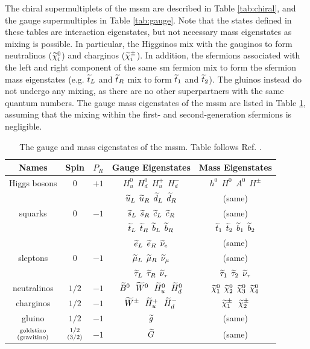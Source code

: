 The chiral supermultiplets of the \gls{mssm} are described in Table \ref{tab:chiral}, and the gauge supermultiples in Table \ref{tab:gauge}. Note that the states defined in these tables are interaction eigenstates, but not necessary mass eigenstates as mixing is possible. In particular, the Higgsinos mix with the gauginos to form neutralinos ($\widetilde{\chi}^0_i$) and charginos ($\widetilde{\chi}^\pm_i$). In addition, the sfermions associated with the left and right component of the same \gls{sm} fermion mix to form the sfermion mass eigenstates (e.g. $\widetilde{t}_L$ and $\widetilde{t}_R$ mix to form $\widetilde{t}_1$ and $\widetilde{t}_2$). The gluinos instead do not undergo any mixing, as there are no other superpartners with the same  quantum numbers. The gauge mass eigenstates of the \gls{mssm} are listed in Table \ref{tab:undiscovered}, assuming that the mixing within the first- and second-generation sfermions is negligible.


\begin{table}[tb]
\begin{center}
\begin{tabular}{c c c c c }
\hline
Names & Spin & $P_R$ & Gauge Eigenstates & Mass Eigenstates \\
\hline\hline
Higgs bosons & 0 & $+1$ & 
$H_u^0\>\> H_d^0\>\> H_u^+ \>\> H_d^-$ 
& 
$h^0\>\> H^0\>\> A^0 \>\> H^\pm$
\\ \hline
& & &${\widetilde u}_L\>\> {\widetilde u}_R\>\> \widetilde d_L\>\> \widetilde d_R$&(same)
\\
squarks& 0&$-1$& ${\widetilde s}_L\>\> {\widetilde s}_R\>\> \widetilde c_L\>\>
\widetilde c_R$& (same) \\
& & &
$\widetilde t_L \>\>\widetilde t_R \>\>\widetilde b_L\>\> \widetilde b_R$ 
&
${\widetilde t}_1\>\> {\widetilde t}_2\>\> \widetilde b_1\>\> \widetilde b_2$
\\ \hline
& & &${\widetilde e}_L\>\> {\widetilde e}_R \>\>\widetilde \nu_e$&(same) 
\\
sleptons& 0&$-1$&${\widetilde \mu}_L\>\>{\widetilde \mu}_R\>\>\widetilde\nu_\mu$&(same)
\\
& & &
$\widetilde \tau_L\>\> \widetilde \tau_R \>\>\widetilde \nu_\tau$ 
&
${\widetilde \tau}_1 \>\>{\widetilde \tau}_2 \>\>\widetilde \nu_\tau$
\\
\hline
neutralinos & $1/2$&$-1$ & 
$\widetilde B^0 \>\>\>\widetilde W^0\>\>\> \widetilde H_u^0\>\>\> \widetilde H_d^0$   
&
$\widetilde \chi^0_1\>\> \widetilde \chi^0_2 \>\>\widetilde \chi^0_3\>\> \widetilde \chi^0_4$ 
\\
\hline
charginos & $1/2$&$-1$ & 
$\widetilde W^\pm\>\>\> \widetilde H_u^+ \>\>\>\widetilde H_d^-$ 
&
$\widetilde \chi_1^\pm\>\>\>\widetilde \chi_2^\pm $ 
\\
\hline
gluino & $1/2$&$-1$ &$\widetilde g$  &(same) \\
\hline
${\rm goldstino}\atop{\rm (gravitino)}$ & ${1/2}\atop{(3/2)}$&$-1$&$\widetilde 
G$  &(same) \\
\hline
\end{tabular}
\caption{The gauge and mass eigenstates of the \gls{mssm}. Table follows Ref. \cite{Martin:1997ns}. 
\label{tab:undiscovered}}
\vspace{-0.4cm}
\end{center}
\end{table}%

